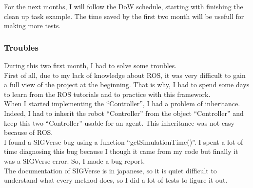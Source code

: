 For the next months, I will follow the DoW schedule, starting with finishing the clean up task example. The time saved by the first two month will be usefull for making more tests.

\subsubsection{Troubles}
During this two first month, I had to solve some troubles.\\
First of all, due to my lack of knowledge about ROS, it was very difficult to gain a full view of the project at the beginning. That is why, I had to spend some days to learn from the ROS tutorials and to practice with this framework.\\
When I started implementing the ``Controller'', I had a problem of inheritance. Indeed, I had to inherit the robot ``Controller'' from the object ``Controller'' and keep this two ``Controller'' usable for an agent. This inheritance was not easy because of ROS.\\
I found a SIGVerse bug using a function ``getSimulationTime()''. I spent a lot of time diagnosing this bug because I though it came from my code but finally it was a SIGVerse error. So, I made a bug report.\\
The documentation of SIGVerse is in japanese, so it is quiet difficult to understand what every method does, so I did a lot of tests to figure it out.
%
%
%
